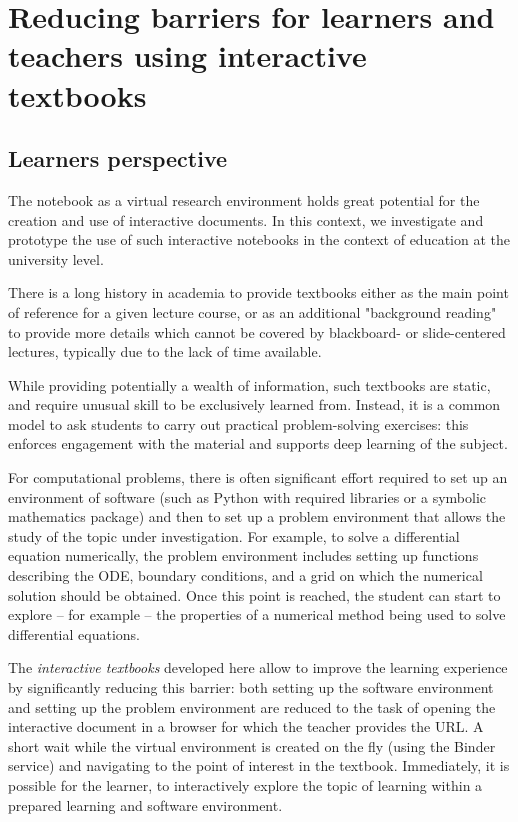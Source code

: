 \documentclass{deliverablereport}
\author{Hans Fangohr, Thomas Kluyver, Marijan Beg, Min
Ragan-Kelly, Vidar Fauske, Marcin Kostur, Jerzy \L{}uczka
 }
\begin{document}
\maketitle
\githubissuedescription
\newpage
\tableofcontents
\newpage


\section{Reducing barriers for learners and teachers using interactive textbooks}

\subsection{Learners perspective}

The \Jupyter notebook as a virtual research environment holds great
potential for the creation and use of interactive documents. In this
context, we investigate and prototype the use of such interactive
notebooks in the context of education at the university level.

There is a long history in academia to provide textbooks either as
the main point of reference for a given lecture course, or as an
additional "background reading" to provide more details which cannot
be covered by blackboard- or slide-centered lectures, typically due to
the lack of time available.

While providing potentially a wealth of information, such textbooks
are static, and require unusual skill to be exclusively learned
from. Instead, it is a common model to ask students to carry out
practical problem-solving exercises: this enforces engagement with the
material and supports deep learning of the subject.

For computational problems, there is often significant effort required
to set up an environment of software (such as Python with required
libraries or a symbolic mathematics package) and then to set up a
problem environment that allows the study of the topic under
investigation. For example, to solve a differential equation
numerically, the problem environment includes setting up functions
describing the ODE, boundary conditions, and a grid on which the
numerical solution should be obtained. Once this point is reached, the
student can start to explore -- for example -- the properties of a
numerical method being used to solve differential equations.

The \emph{interactive textbooks} developed here allow to improve the
learning experience by significantly reducing this barrier: both
setting up the software environment and setting up the problem
environment are reduced to the task of opening the interactive
document in a browser for which the teacher provides the URL. A short
wait while the virtual environment is created on the fly (using the
Binder service) and navigating to the point of interest in the
textbook. Immediately, it is possible for the learner, to
interactively explore the topic of learning within a prepared learning
and software environment.
\end{document}
